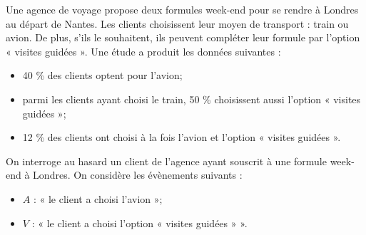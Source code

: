 Une agence de voyage propose deux formules week-end pour se rendre à Londres au départ de Nantes. Les clients choisissent leur moyen de transport : train ou avion. De plus, s’ils le souhaitent, ils peuvent compléter leur formule par l’option « visites guidées ». Une étude a produit les données suivantes :

\begin{itemize}
	\item 40 \% des clients optent pour l’avion;
	\item parmi les clients ayant choisi le train, 50 \% choisissent aussi l’option « visites guidées »;
	\item 12 \% des clients ont choisi à la fois l’avion et l’option « visites guidées ».
\end{itemize}

On interroge au hasard un client de l’agence ayant souscrit à une formule week-end à Londres. On considère les évènements suivants :

\begin{itemize}
	\item $A$ : « le client a choisi l’avion »;
	\item $V$ : « le client a choisi l’option « visites guidées » ».
\end{itemize}

